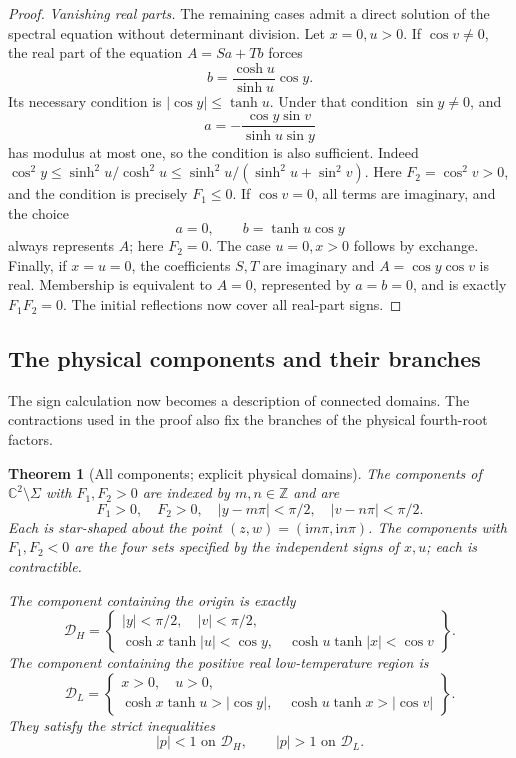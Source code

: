 \documentclass[11pt]{article}
\numberwithin{equation}{section}
\newtheorem{theorem}{Theorem}[section]
\theoremstyle{definition}
\newcommand{\C}{\mathbb C}
\newcommand{\Z}{\mathbb Z}
\newcommand{\ii}{\mathrm i}
\renewcommand{\DH}{\mathcal D_H}
\newcommand{\DL}{\mathcal D_L}
\begin{document}
\begin{proof}
\emph{Vanishing real parts.} The remaining cases admit a direct
solution of the spectral equation without determinant division.  Let \(x=0,u>0\).  If \(\cos v\ne0\),
the real part of the equation \(A=Sa+Tb\) forces
\[
 b=\frac{\cosh u}{\sinh u}\cos y.
\]
Its necessary condition is \(|\cos y|\leq\tanh u\).
Under that condition \(\sin y\ne0\), and
\[
 a=-\frac{\cos y\sin v}{\sinh u\sin y}
\]
has modulus at most one, so the condition is also sufficient.
Indeed
\(\cos^2y\leq\sinh^2u/\cosh^2u
\leq\sinh^2u/(\sinh^2u+\sin^2v)\).
Here \(F_2=\cos^2v>0\), and the condition is precisely \(F_1\leq0\).
If \(\cos v=0\), all terms are imaginary, and the choice
\[
                 a=0,\qquad b=\tanh u\cos y
\]
always represents \(A\); here \(F_2=0\).
The case \(u=0,x>0\) follows by exchange.  Finally, if \(x=u=0\),
the coefficients \(S,T\) are imaginary and \(A=\cos y\cos v\)
is real.  Membership is equivalent to \(A=0\), represented by
\(a=b=0\), and is exactly \(F_1F_2=0\).
The initial reflections now cover all real-part signs.
\end{proof}

\subsection{The physical components and their branches}
\label{geo:components-section}

The sign calculation now becomes a description of connected domains.
The contractions used in the proof also fix the branches of the
physical fourth-root factors.

\begin{theorem}[All components; explicit physical domains]
\label{geo:components}
The components of \(\C^2\setminus\Sigma\) with \(F_1,F_2>0\)
are indexed by \(m,n\in\Z\) and are
\[
 F_1>0,\quad F_2>0,\quad
 |y-m\pi|<\pi/2,\quad |v-n\pi|<\pi/2.
\]
Each is star-shaped about the point
\((z,w)=(\ii m\pi,\ii n\pi)\).
The components with \(F_1,F_2<0\) are the four sets specified
by the independent signs of \(x,u\); each is contractible.

The component containing the origin is exactly
\begin{equation}\label{geo:DH}
 \DH=\left\{
 \begin{array}{l}
 |y|<\pi/2,\quad |v|<\pi/2,\\
 \cosh x\tanh|u|<\cos y,\quad
 \cosh u\tanh|x|<\cos v
 \end{array}\right\}.
\end{equation}
The component containing the positive real low-temperature region is
\begin{equation}\label{geo:DL}
 \DL=\left\{
 \begin{array}{l}
 x>0,\quad u>0,\\
 \cosh x\tanh u>|\cos y|,\quad
 \cosh u\tanh x>|\cos v|
 \end{array}\right\}.
\end{equation}
They satisfy the strict inequalities
\begin{equation}\label{geo:p-domains}
                         |p|<1\text{ on }\DH,\qquad
                         |p|>1\text{ on }\DL.
\end{equation}
\end{theorem}
\end{document}
